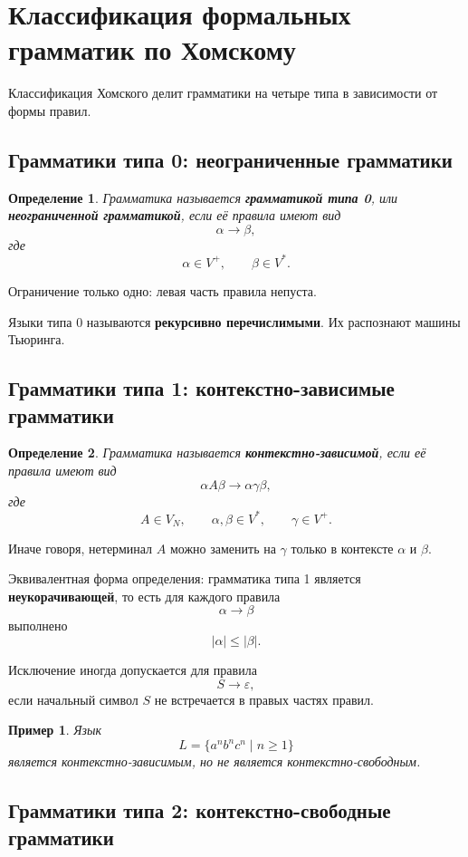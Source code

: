 \documentclass[12pt,a4paper]{article}
\newtheorem{definition}{Определение}
\newtheorem{example}{Пример}
\newcommand{\eps}{\varepsilon}
\begin{document}
\section{Классификация формальных грамматик по Хомскому}

Классификация Хомского делит грамматики на четыре типа в зависимости от формы правил.

\subsection{Грамматики типа 0: неограниченные грамматики}

\begin{definition}
Грамматика называется \textbf{грамматикой типа 0}, или \textbf{неограниченной грамматикой}, если её правила имеют вид
\[
\alpha\to\beta,
\]
где
\[
\alpha\in V^+,\qquad \beta\in V^*.
\]
\end{definition}

Ограничение только одно: левая часть правила непуста.

Языки типа 0 называются \textbf{рекурсивно перечислимыми}. Их распознают машины Тьюринга.

\subsection{Грамматики типа 1: контекстно-зависимые грамматики}

\begin{definition}
Грамматика называется \textbf{контекстно-зависимой}, если её правила имеют вид
\[
\alpha A\beta \to \alpha \gamma \beta,
\]
где
\[
A\in V_N,\qquad \alpha,\beta\in V^*,\qquad \gamma\in V^+.
\]
\end{definition}

Иначе говоря, нетерминал $A$ можно заменить на $\gamma$ только в контексте $\alpha$ и $\beta$.

Эквивалентная форма определения: грамматика типа 1 является \textbf{неукорачивающей}, то есть для каждого правила
\[
\alpha\to\beta
\]
выполнено
\[
|\alpha|\le |\beta|.
\]

Исключение иногда допускается для правила
\[
S\to \eps,
\]
если начальный символ $S$ не встречается в правых частях правил.

\begin{example}
Язык
\[
L=\{a^n b^n c^n\mid n\ge 1\}
\]
является контекстно-зависимым, но не является контекстно-свободным.
\end{example}

\subsection{Грамматики типа 2: контекстно-свободные грамматики}
\end{document}

